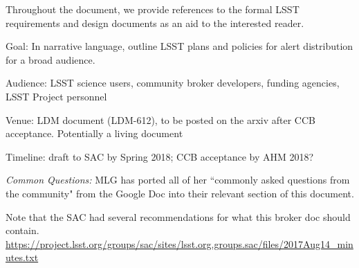 Throughout the document, we provide references to the formal LSST requirements and design documents as an aid to the interested reader.

Goal: In narrative language, outline LSST plans and policies for alert distribution for a broad audience.

Audience: LSST science users, community broker developers, funding agencies, LSST Project personnel

Venue:  LDM document (LDM-612), to be posted on the arxiv after CCB acceptance. Potentially a living document

Timeline: draft to SAC by Spring 2018; CCB acceptance by AHM 2018?

{\it Common Questions:} MLG has ported all of her ``commonly asked questions from the community" from the Google Doc into their relevant section of this document.

Note that the SAC had several recommendations for what this broker doc should contain.
\url{https://project.lsst.org/groups/sac/sites/lsst.org.groups.sac/files/2017Aug14_minutes.txt}

